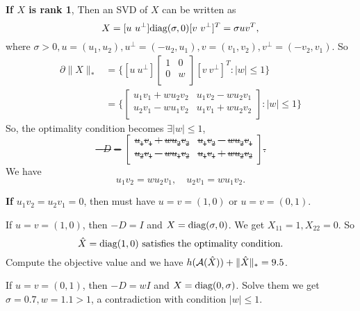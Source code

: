 \textbf{If $X$ is rank 1},
Then an SVD of $X$ can be written as
\begin{equation}
    X=[u\ u^\perp] {\text{diag}}(\sigma,0) [v\ v^\perp]^T = \sigma uv^T,
\end{equation}
where $\sigma>0, u=(u_1,u_2), u^\perp=(-u_2,u_1), v=(v_1,v_2), v^\perp=(-v_2,v_1)$.
So
\begin{equation}
\begin{split}
    \partial\|X\|_*
        &=\bigg\{[u\ u^\perp]
            \begin{bmatrix}
                1 & 0    \\
                0 & w \\
            \end{bmatrix}
            [v\ v^\perp]^T:|w|\le1\bigg\} \\
        &=\bigg\{
            \begin{bmatrix}
                u_1v_1+wu_2v_2 & u_1v_2-wu_2v_1 \\
                u_2v_1-wu_1v_2 & u_1v_1+wu_2v_2 \\
            \end{bmatrix}
            :|w|\le1\bigg\}
\end{split}
\end{equation}
So, the optimality condition becomes $\exists |w|\le1$, \st
\begin{equation}
    -D=\begin{bmatrix}
            u_1v_1+wu_2v_2 & u_1v_2-wu_2v_1 \\
            u_2v_1-wu_1v_2 & u_1v_1+wu_2v_2 \\
        \end{bmatrix}.
\end{equation}
We have
\begin{equation}
u_1v_2=wu_2v_1,\quad u_2v_1=wu_1v_2.
\end{equation}

\textbf{If} $u_1v_2=u_2v_1=0$,
then must have $u=v=(1,0)$ or $u=v=(0,1)$.

If $u=v=(1,0)$,
then $-D=I$ and $X={\text{diag}}(\sigma,0)$.
We get $X_{11}=1,X_{22}=0$.
So
\begin{equation}
    \hat X={\text{diag}}(1,0) \text{ satisfies the optimality condition}.
\end{equation}
Compute the objective value and we have
$h(\mathcal{A}(\hat X))+\|\hat X\|_*=9.5$.

If $u=v=(0,1)$,
then $-D=wI$ and $X={\text{diag}}(0,\sigma)$.
Solve them we get $\sigma=0.7, w=1.1>1$,
a contradiction with condition $|w|\le1$.

